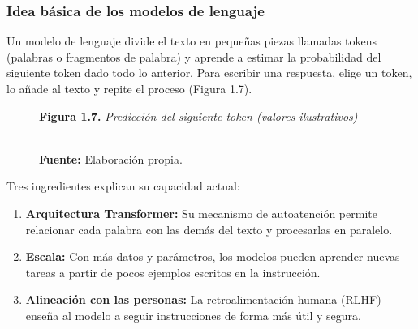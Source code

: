 \subsubsection{Idea básica de los modelos de lenguaje}
Un modelo de lenguaje divide el texto en pequeñas piezas llamadas tokens (palabras o fragmentos de palabra) y aprende a estimar la probabilidad del siguiente token dado todo lo anterior. Para escribir una respuesta, elige un token, lo añade al texto y repite el proceso (Figura 1.7).

\begin{figure}[htpb!]
\centering
\begin{tcolorbox}[colback=white, colframe=unmsm_gold, arc=3pt, boxrule=0.8pt, top=0.3cm, bottom=0.3cm, left=0.4cm, right=0.4cm]
\centering
\small\sffamily
\textbf{Figura 1.7.} \textit{Predicción del siguiente token (valores ilustrativos)}\\[0.25cm]
\\[0.2cm]
\raggedright\scriptsize \textbf{Fuente:} Elaboración propia.
\end{tcolorbox}
\end{figure}

Tres ingredientes explican su capacidad actual:
\begin{enumerate}
    \item \textbf{Arquitectura Transformer:} Su mecanismo de autoatención permite relacionar cada palabra con las demás del texto y procesarlas en paralelo.
    \item \textbf{Escala:} Con más datos y parámetros, los modelos pueden aprender nuevas tareas a partir de pocos ejemplos escritos en la instrucción.
    \item \textbf{Alineación con las personas:} La retroalimentación humana (RLHF) enseña al modelo a seguir instrucciones de forma más útil y segura.
\end{enumerate}

